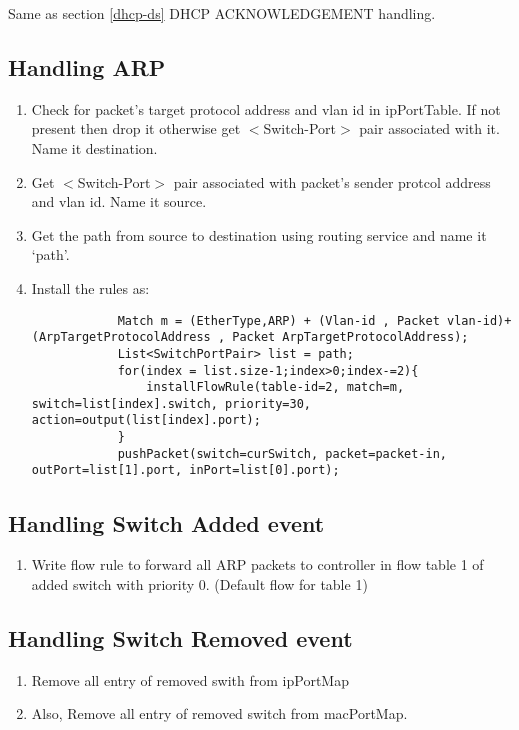 \documentclass{article}
\begin{document}
Same as section \ref{dhcp-ds} DHCP ACKNOWLEDGEMENT handling.

\subsection{Handling ARP}

\begin{enumerate}
	\item Check for packet's target protocol address and vlan id in ipPortTable. If not present then drop it otherwise get $<$Switch-Port$>$ pair associated with it. Name it destination.
	\item Get $<$Switch-Port$>$ pair associated with packet's sender protcol address and vlan id. Name it source.
	\item Get the path from source to destination using routing service and name it `path'.
	\item Install the rules as:
		\begin{lstlisting}
			Match m = (EtherType,ARP) + (Vlan-id , Packet vlan-id)+(ArpTargetProtocolAddress , Packet ArpTargetProtocolAddress);
			List<SwitchPortPair> list = path;
			for(index = list.size-1;index>0;index-=2){
				installFlowRule(table-id=2, match=m, switch=list[index].switch, priority=30, action=output(list[index].port);
			}
			pushPacket(switch=curSwitch, packet=packet-in, outPort=list[1].port, inPort=list[0].port);
		\end{lstlisting}
\end{enumerate}

\subsection{Handling Switch Added event}

\begin{enumerate}
	\item Write flow rule to forward all ARP packets to controller in flow table 1 of added switch with priority 0. (Default flow for table 1) 
\end{enumerate}



\subsection{Handling Switch Removed event}

\begin{enumerate}
	\item Remove all entry of removed swith from ipPortMap
	\item Also, Remove all entry of removed switch from macPortMap.
\end{enumerate}

\printbibliography
\end{document}
